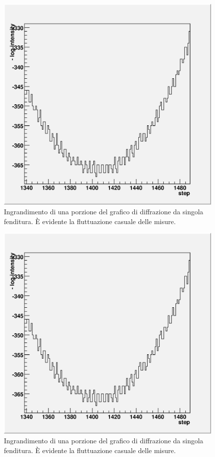 \documentclass[italian,a4paper]{article}
\begin{document}
\begin{figure}[!h]\centering
\includegraphics[scale=.6]{dentini.eps}
\caption{Ingrandimento di una porzione del grafico di diffrazione da singola fenditura. \`{E} evidente la fluttuazione casuale delle misure.}\label{dentini}
\end{figure}
\begin{figure}[!h]\centering
\includegraphics[scale=.6]{dentini.eps}
\caption{Ingrandimento di una porzione del grafico di diffrazione da singola fenditura. \`{E} evidente la fluttuazione casuale delle misure.}\label{dentini}
\end{figure}
\end{document}
